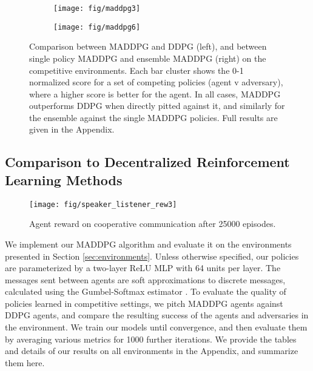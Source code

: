 \documentclass{article}
\newcommand{\hide}[1]{}
\begin{document}
\begin{figure}
\begin{subfigure}{.52\textwidth}
  \centering
  \texttt{[image: fig/maddpg3]}
\end{subfigure}
\hspace{1mm}
\begin{subfigure}{.48\textwidth}
  \centering
  \texttt{[image: fig/maddpg6]}
\end{subfigure}
\vspace{-2mm}
\caption{Comparison between MADDPG and DDPG (left), and between single policy MADDPG and ensemble MADDPG (right) on the competitive environments. Each bar cluster shows the 0-1 normalized score for a set of competing policies (agent v adversary), where a higher score is better for the agent. In all cases, MADDPG outperforms DDPG when directly pitted against it, and similarly for the ensemble against the single MADDPG policies. Full results are given in the Appendix. \vspace{-3mm}}\label{fig:adv}
\end{figure}



\subsection{Comparison to Decentralized Reinforcement Learning Methods}
\label{sec:maddpgexperiments}

\begin{wrapfigure}{r}{0.5\textwidth}
\vspace{-6mm}
\texttt{[image: fig/speaker\_listener\_rew3]}

\caption{\label{fig:comm_curves} Agent reward on cooperative communication after 25000 episodes. \vspace{-3mm}}
\end{wrapfigure}
We implement our MADDPG algorithm and evaluate it on the environments presented in Section \ref{sec:environments}. Unless otherwise specified, our policies are parameterized by a two-layer ReLU MLP with 64 units per layer. 
The messages sent between agents are soft approximations to discrete messages, calculated using the Gumbel-Softmax estimator \cite{jang2016categorical}. 
To evaluate the quality of policies learned in competitive settings, we pitch MADDPG agents against DDPG agents, and compare the resulting success of the agents and adversaries in the environment. We train our models until convergence, and then evaluate them by averaging various metrics for 1000 further iterations. 
We provide the tables and details of our results on all environments in the Appendix, and summarize them here. \hide{ (including hyperparameters)}
\end{document}
